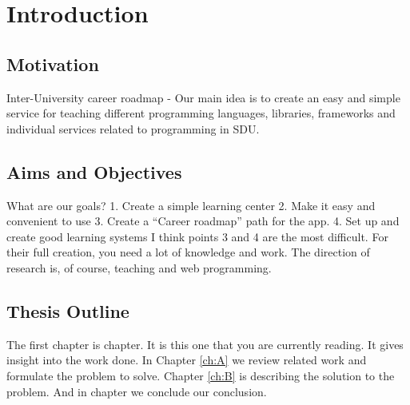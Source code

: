 \chapter{Introduction}\label{ch:intro}
\section{Motivation}
Inter-University career roadmap - Our main idea is to create an easy and simple service for teaching different programming languages, libraries, frameworks and individual services related to programming in SDU.
\section{Aims and Objectives}
What are our goals?
1. Create a simple learning center
2. Make it easy and convenient to use
3. Create a “Career roadmap” path for the app.
4. Set up and create good learning systems
I think points 3 and 4 are the most difficult. For their full creation, you need a lot of knowledge and work.
The direction of research is, of course, teaching and web programming.
\section{Thesis Outline}
The first chapter is  chapter. It is this one that you are currently reading. It gives insight into the work done. In Chapter \ref{ch:A} we review related work and formulate the problem to solve. Chapter \ref{ch:B} is describing the solution to the problem. And in  chapter we conclude our conclusion.

